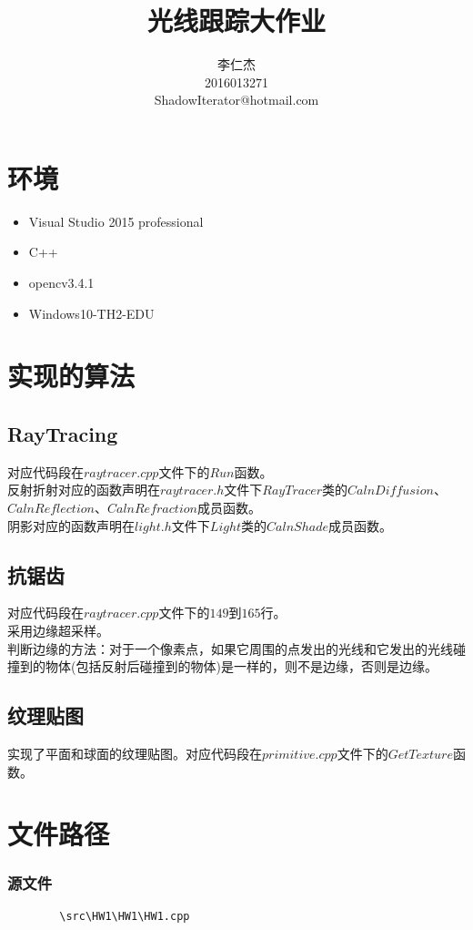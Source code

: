 ﻿\documentclass{article}
\title{光线跟踪大作业}
\author{李仁杰\\2016013271\\ShadowIterator@hotmail.com}
\date{}
\begin{document}
  \maketitle
  \section*{\color{blue}环境}
    \noindent
    \begin{itemize}
        \item Visual Studio 2015 professional
        \item C++
        \item opencv3.4.1
        \item Windows10-TH2-EDU
    \end{itemize}

    \section*{\color{blue}实现的算法}
    \subsection*{\color{gray}RayTracing}
    对应代码段在$raytracer.cpp$文件下的$Run$函数。\\
    反射折射对应的函数声明在$raytracer.h$文件下$RayTracer$类的$CalnDiffusion$、$CalnReflection$、$CalnRefraction$成员函数。\\
    阴影对应的函数声明在$light.h$文件下$Light$类的$CalnShade$成员函数。
    \subsection*{\color{gray}抗锯齿}
    对应代码段在$raytracer.cpp$文件下的$149$到$165$行。\\
    采用边缘超采样。\\
    判断边缘的方法：对于一个像素点，如果它周围的点发出的光线和它发出的光线碰撞到的物体(包括反射后碰撞到的物体)是一样的，则不是边缘，否则是边缘。
    \subsection*{\color{gray}纹理贴图}
    实现了平面和球面的纹理贴图。对应代码段在$primitive.cpp$文件下的$GetTexture$函数。
    \section*{\color{blue}文件路径}
        \subsubsection*{\color{black}源文件}
        \noindent
        \begin{lstlisting}
        \src\HW1\HW1\HW1.cpp
        \end{lstlisting}
\end{document}
